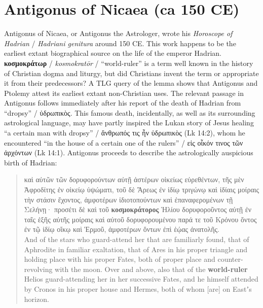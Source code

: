 %
%
\chapter{Antigonus of Nicaea (ca 150 CE)}%
\vspace*{3mm}%
\justifying%
%
\noindent{}Antigonus of Nicaea, or Antigonus the Astrologer, %
wrote his \textit{Horoscope of Hadrian} / \textit{Hadriani genitura} around 150 CE. %
This work happens to be the earliest extant biographical source on the life of the emperor Hadrian. \\[1mm] %

\noindent{}\textbf{κοσμοκράτωρ} / \textit{kosmokratōr} / “world-ruler” is a term well known in the history of Christian %
dogma and liturgy, but did Christians invent the term or appropriate it from their predecessors? %
A TLG query of the lemma shows that Antigonus and Ptolemy attest its %
earliest extant non-Christian uses. %
The relevant passage in Antigonus follows immediately after his report of the death of Hadrian %
from “dropsy” / ὑδρωπικὸς. This famous death, incidentally, %
as well as its surrounding astrological language, %
may have partly inspired the Lukan story of Jesus healing “a certain man with dropsy” / %
ἄνθρωπός τις ἦν ὑδρωπικὸς (Lk 14:2), %
whom he encountered “in the house of a certain one of the rulers” / %
εἰς οἶκόν τινος τῶν ἀρχόντων (Lk 14:1). %
Antigonus proceeds to describe the astrologically auspicious birth of Hadrian: %

\vspace*{2mm} 
 \begin{quote}καὶ αὐτῶν τῶν δορυφορούντων αὐτῇ ἀστέρων οἰκείως εὑρεθέντων, %
 τῆς μὲν Ἀφροδίτης ἐν οἰκείῳ ὑψώματι, %
 τοῦ δὲ Ἄρεως ἐν ἰδίῳ τριγώνῳ καὶ ἰδίαις μοίραις τὴν στάσιν ἔχοντος, %
 ἀμφοτέρων ἰδιοτοπούντων καὶ ἐπαναφερομένων τῇ Σελήνῃ· %
 προσέτι δὲ καὶ τοῦ \textbf{κοσμοκράτορος} Ἡλίου δορυφοροῦντος αὐτῇ ἐν ταῖς ἑξῆς αὐτῆς %
 μοίραις καὶ αὐτοῦ δορυφορουμένου παρά τε τοῦ Κρόνου ὄντος ἐν τῷ ἰδίῳ οἴκῳ καὶ Ἑρμοῦ, %
 ἀμφοτέρων ὄντων ἐπὶ ἑῴας ἀνατολῆς. \\[1mm] %
 And of the stars who guard-attend her that are familiarly found, %
 that of Aphrodite in familiar exaltation, %
 that of Ares in his proper triangle and holding place with his proper Fates, %
 both of proper place and counter-revolving with the moon. %
 Over and above, also that of the \textbf{world-ruler} Helios guard-attending her %
 in her successive Fates, and he himself attended by Cronos in his proper house and Hermes, %
 both of whom [are] on Eastʼs horizon. %
 \end{quote} %
 \vspace*{2mm}

